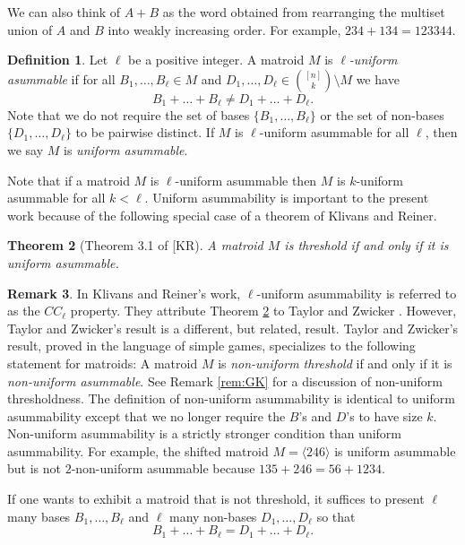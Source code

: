\documentclass[10pt,a4paper]{amsart}
\makeatletter
\let\laneX@cite\cite
\renewcommand{\cite}{\protect\laneX@citenew}
\newcommand{\laneX@citenew}{\@ifnextchar[{\laneX@cite@a}{\laneX@cite@b}}
\def\laneX@cite@b#1{\laneX@cite{#1}}
\def\laneX@cite@a[#1]{\@ifnextchar[{\laneX@cite@c{#1}}{\laneX@cite@d{#1}}}
\def\laneX@cite@d#1#2{\laneX@cite[#1]{#2}}
\def\laneX@cite@c#1[#2]#3{[\unskip #1 \csname b@#3\endcsname, #2]}
\theoremstyle{definition}
\newtheorem{defn}{Definition}[section]
\newtheorem{remark}[defn]{Remark}
\theoremstyle{plain}
\newtheorem{thrm}[defn]{Theorem}
\makeatother
\begin{document}
We can also think of $A+B$ as the word obtained from rearranging the multiset union of $A$ and $B$ into weakly increasing order. For example, $234+134= 123344$.

\begin{defn}
\label{def:trade_robust}
Let $\ell$ be a positive integer. A matroid $M$ is \emph{$\ell$-uniform asummable} if for all $B_1,\ldots, B_\ell \in M$ and $D_1,\ldots, D_\ell \in \binom{[n]}{k}\setminus M$ we have
\[B_1+\ldots+B_\ell \neq D_1+\ldots +D_\ell. \]
Note that we do not require the set of bases $\{B_1,\ldots, B_\ell\}$ or the set of non-bases $\{D_1,\ldots, D_\ell\}$ to be pairwise distinct. If $M$ is $\ell$-uniform asummable for all $\ell$, then we say $M$ is \emph{uniform asummable}.
\end{defn}


Note that if a matroid $M$ is $\ell$-uniform asummable then $M$ is $k$-uniform asummable for all $k<\ell$. Uniform asummability is important to the present work because of the following special case of a theorem of Klivans and Reiner.

\begin{thrm}[Theorem 3.1 of \cite{KR}]
  \label{thrm:KR}
A matroid $M$ is threshold if and only if it is uniform asummable.
\end{thrm}

\begin{remark}
  In Klivans and Reiner's work, $\ell$-uniform asummability is referred to as the $CC_\ell$ property. They attribute Theorem \ref{thrm:KR} to Taylor and Zwicker \cite[Theorem $2.4.2$]{TZ}. However, Taylor and Zwicker's result is a different, but related, result. Taylor and Zwicker's result, proved in the language of simple games, specializes to the following statement for matroids: A matroid $M$ is \emph{non-uniform threshold} if and only if it is \emph{non-uniform asummable}. See Remark \ref{rem:GK} for a discussion of non-uniform thresholdness. The definition of non-uniform asummability is identical to uniform asummability except that we no longer require the $B$'s and $D$'s to have size $k$. Non-uniform asummability is a strictly stronger condition than uniform asummability. For example, the shifted matroid $M= \langle 246 \rangle$ is uniform asummable but is not $2$-non-uniform asummable because $135 + 246 = 56 + 1234$.
\end{remark}

If one wants to exhibit a matroid that is not threshold, it suffices to present $\ell$ many bases $B_1,\ldots, B_\ell$ and $\ell$ many non-bases $D_1,\ldots, D_\ell$ so that 
\[B_1+\ldots+B_\ell = D_1+\ldots+D_\ell. \]
\end{document}
